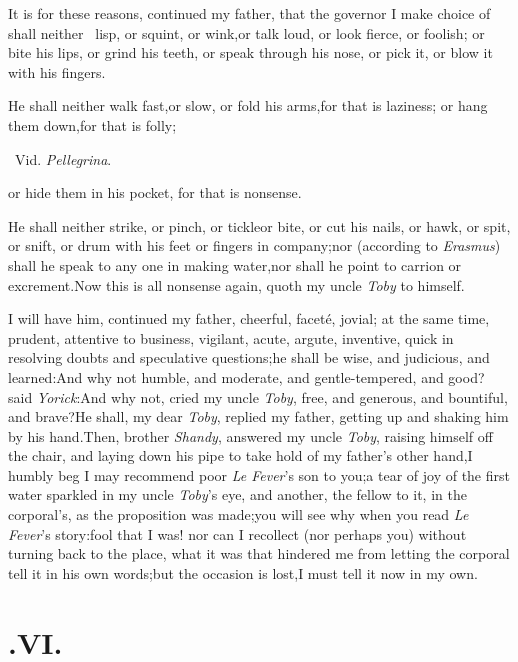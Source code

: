\documentclass{article}
\begin{document}
It is for these reasons, continued my father, that the governor
I make choice of shall neither \fnast\ lisp, or squint, or
wink,\break or talk loud, or look fierce, or foolish;\break\tsh
or bite his lips, or grind his teeth, or speak through his nose,
or pick it, or blow it with his fingers.\tsh

He shall neither walk fast,\tsk or slow, or fold his
arms,\tsk for that is laziness; \tsk\break or hang them
down,\tsk for that is folly;\break
\centerline{\footnotesize \fnast\ Vid. \textit{Pellegrina}.}
\eject
\noindent
or hide them in his pocket, for that is nonsense.\tsh

He shall neither strike, or pinch, or tickle\tsk or bite, or
cut his nails, or hawk, or spit, or snift, or drum with his feet or
fingers in company;\tsh nor (according to \textit{Erasmus})
shall he speak to any one in making water,\tsk nor shall he point to
carrion or excrement.\tsh Now this is all nonsense again,
quoth my uncle \textit{Toby} to himself.\tsh

I will have him, continued my father, cheerful, faceté,
jovial; at the same time, prudent, attentive to business, vigilant,
acute, argute, inventive, quick in resolving doubts and speculative
questions;\tsh he shall be wise, and judicious, and
learned:\tsh And why not humble, and moderate, and
gentle-tempered, and good? said \textit{Yorick}:\tsh And why
not, cried my uncle \textit{Toby}, free, and generous, and bountiful,
and brave?\tsh He shall, my dear \textit{Toby}, replied my
father, getting up and shaking him by his hand.\tsk Then, brother
\textit{Shandy}, answered my uncle \textit{Toby}, raising himself off
the chair, and laying down his pipe to take hold of my
father’s other hand,\tsk I humbly beg I may recommend poor
\textit{Le Fever}’s son to you;\tsh a tear of joy of
the first water sparkled in my uncle \textit{Toby}’s eye, and
another, the fellow to it, in the corporal’s, as the
proposition was made;\tsh you will see why when you read \textit{Le
Fever}’s story:\tsh fool that I was! nor can I
recollect (nor perhaps you) without turning back to the place, what
it was that hindered me from letting the corporal tell it in his
own words;\tsk but the occasion is lost,\tsk I must tell it now
in my own.






\section{.\enspace VI.}
\end{document}
